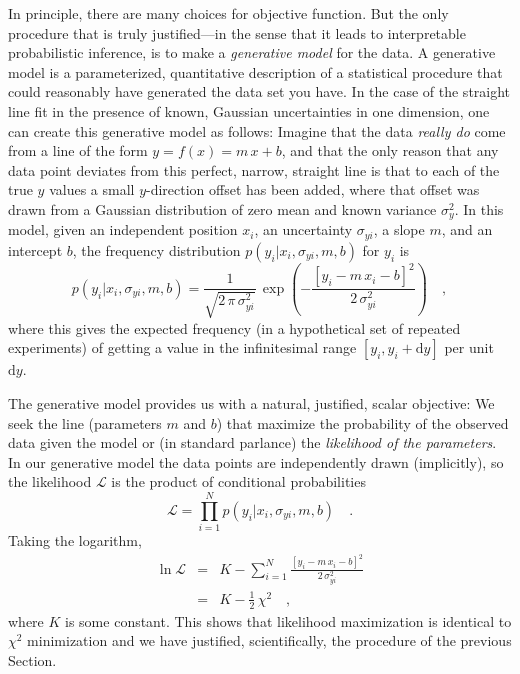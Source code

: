 \documentclass[12pt,twoside]{article}
\newcommand{\sectionname}{Section}
\renewcommand{\d}{\mathrm{d}}
\newcommand{\like}{\mathscr{L}}
\begin{document}
In principle, there are many choices for objective function.  But the
only procedure that is truly justified---in the sense that it leads to
interpretable probabilistic inference, is to make a \emph{generative
  model} for the data.  A generative model is a parameterized,
quantitative description of a statistical procedure that could
reasonably have generated the data set you have.  In the case of the
straight line fit in the presence of known, Gaussian uncertainties in
one dimension, one can create this generative model as follows:
Imagine that the data \emph{really do} come from a line of the form $y
= f(x) = m\,x+b$, and that the only reason that any data point
deviates from this perfect, narrow, straight line is that to each of
the true $y$ values a small $y$-direction offset has been added, where
that offset was drawn from a Gaussian distribution of zero mean and
known variance $\sigma_y^2$.  In this model, given an independent
position $x_i$, an uncertainty $\sigma_{yi}$, a slope $m$, and an
intercept $b$, the frequency distribution $p(y_i|x_i,\sigma_{yi},m,b)$
for $y_i$ is
\begin{equation}\label{eq:objectivei}
p(y_i|x_i,\sigma_{yi},m,b) = \frac{1}{\sqrt{2\,\pi\,\sigma_{yi}^2}}
 \,\exp\left(-\frac{[y_i - m\,x_i - b]^2}{2\,\sigma_{yi}^2}\right) \quad ,
\end{equation}
where this gives the expected frequency (in a hypothetical set of
repeated experiments) of getting a value in the infinitesimal range
$[y_i,y_i+\d y]$ per unit $\d y$.

The generative model provides us with a natural, justified, scalar
objective: We seek the line (parameters $m$ and $b$) that maximize the
probability of the observed data given the model or (in standard
parlance) the \emph{likelihood of the parameters}.  In our generative
model the data points are independently drawn (implicitly), so the
likelihood $\like$ is the product of conditional probabilities
\begin{equation}\label{eq:like}
\like = \prod_{i=1}^N p(y_i|x_i,\sigma_{yi},m,b) \quad .
\end{equation}
Taking the logarithm,
\begin{eqnarray}\displaystyle
\ln\like
 & = & K - \sum_{i=1}^N \frac{[y_i - m\,x_i - b]^2}{2\,\sigma_{yi}^2} \nonumber\\
 & = & K - \frac{1}{2}\,\chi^2 \quad ,
\end{eqnarray}
where $K$ is some constant.  This shows that likelihood maximization
is identical to $\chi^2$ minimization and we have justified,
scientifically, the procedure of the previous \sectionname.
\end{document}
